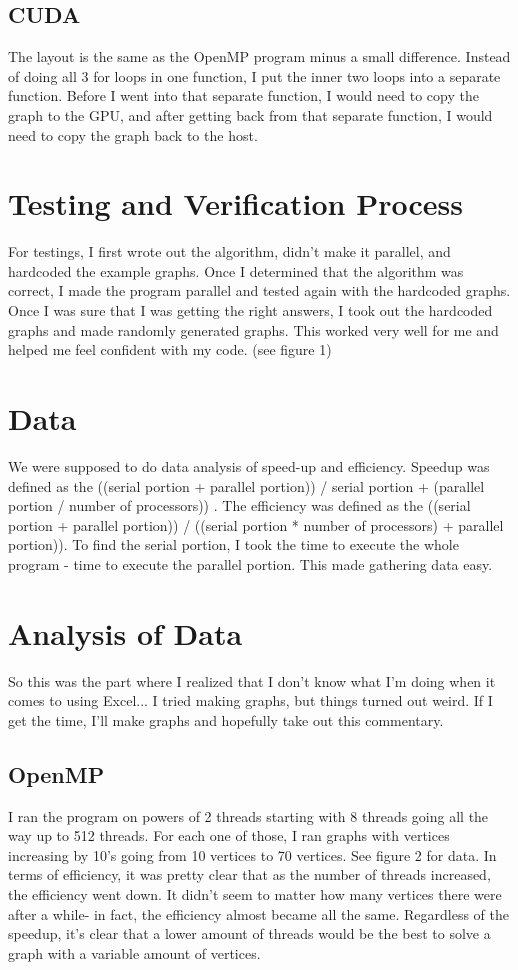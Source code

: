 \documentclass{article}
\begin{document}
\subsection{CUDA}
The layout is the same as the OpenMP program minus a small difference. Instead of doing all 3 for loops in one function, I put the inner two loops into a separate function. Before I went into that separate function, I would need to copy the graph to the GPU, and after getting back from that separate function, I would need to copy the graph back to the host.

\section{Testing and Verification Process}
For testings, I first wrote out the algorithm, didn't make it parallel, and hardcoded the example graphs. Once I determined that the algorithm was correct, I made the program parallel and tested again with the hardcoded graphs. Once I was sure that I was getting the right answers, I took out the hardcoded graphs and made randomly generated graphs. This worked very well for me and helped me feel confident with my code. (see figure 1)


\section{Data}
We were supposed to do data analysis of speed-up and efficiency. Speedup was defined as the ((serial portion + parallel portion)) / serial portion + (parallel portion / number of processors)) . The efficiency was defined as the ((serial portion + parallel portion)) / ((serial portion * number of processors) + parallel portion)). To find the serial portion, I took the time to execute the whole program - time to execute the parallel portion. This made gathering data easy.

\section{Analysis of Data}
So this was the part where I realized that I don't know what I'm doing when it comes to using Excel... I tried making graphs, but things turned out weird. If I get the time, I'll make graphs and hopefully take out this commentary. 
\subsection{OpenMP}
I ran the program on powers of 2 threads starting with 8 threads going all the way up to 512 threads. For each one of those, I ran graphs with vertices increasing by 10's going from 10 vertices to 70 vertices. See figure 2 for data. In terms of efficiency, it was pretty clear that as the number of threads increased, the efficiency went down. It didn't seem to matter how many vertices there were after a while- in fact, the efficiency almost became all the same. Regardless of the speedup, it's clear that a lower amount of threads would be the best to solve a graph with a variable amount of vertices.
\end{document}

